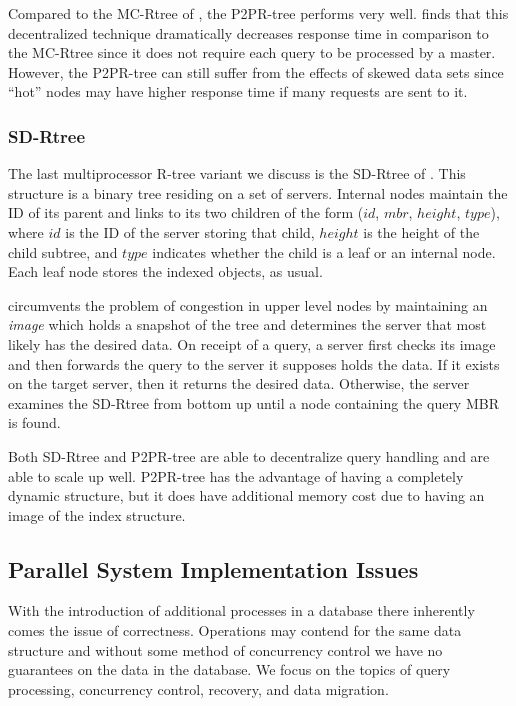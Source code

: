 Compared to the MC-Rtree of \cite{schnitzer1999master}, the P2PR-tree performs
very well. \cite{mondal2005p2pr} finds that this decentralized technique 
dramatically decreases response time in comparison to the MC-Rtree since it does
not require each query to be processed by a master. However, the P2PR-tree can
still suffer from the effects of skewed data sets since ``hot'' nodes may have
higher response time if many requests are sent to it.

\subsubsection{SD-Rtree}
The last multiprocessor R-tree variant we discuss is the SD-Rtree of 
\cite{du2007sd}. This structure is a binary tree residing on a set of servers.
Internal nodes maintain the ID of its parent and links to its two children of 
the form ($id$, $mbr$, $height$, $type$), where $id$ is the ID of the server 
storing that child, $height$ is the height of the child subtree, and $type$ 
indicates whether the child is a leaf or an internal node. Each leaf node stores 
the indexed objects, as usual.

\cite{du2007sd} circumvents the problem of congestion in upper level nodes by 
maintaining an \emph{image} which holds a snapshot of the tree and determines 
the server that most likely has the desired data. On receipt of a query, a 
server first checks its image and then forwards the query to the server it 
supposes holds the data. If it exists on the target server, then it returns the
desired data. Otherwise, the server examines the SD-Rtree from bottom up until a 
node containing the query MBR is found. %

Both SD-Rtree and P2PR-tree are able to decentralize query handling and are able
to scale up well. P2PR-tree has the advantage of having a completely dynamic 
structure, but it does have additional memory cost due to having an image of the 
index structure.

\subsection{Parallel System Implementation Issues}
With the introduction of additional processes in a database there inherently
comes the issue of correctness. Operations may contend for the same data 
structure and without some method of concurrency control we have no guarantees
on the data in the database. We focus on the topics of query processing, 
concurrency control, recovery, and data migration. 

